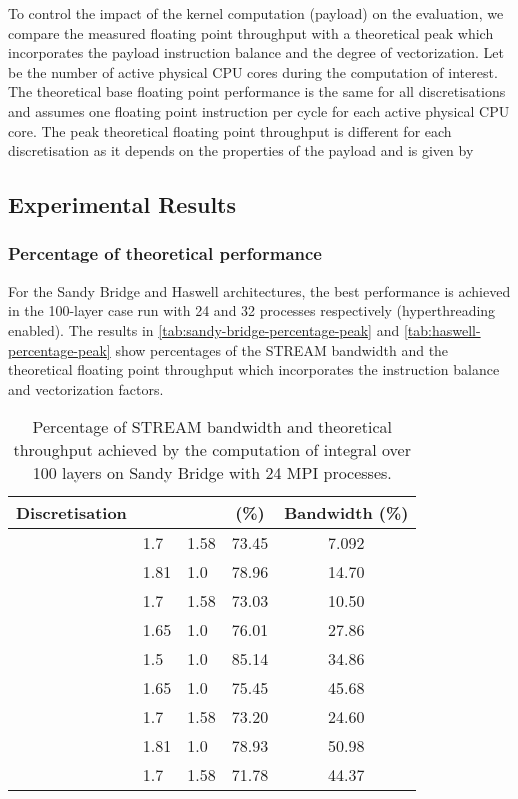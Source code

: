 \documentclass[11pt, a4paper]{scrartcl}
\begin{document}
To control the impact of the kernel computation (payload) on the
evaluation, we compare the measured floating point throughput with a
theoretical peak which incorporates the payload instruction balance
and the degree of vectorization. Let  be the number of active
physical CPU cores during the computation of interest. The theoretical
base floating point performance  is the same for all
discretisations and assumes one floating point instruction per cycle
for each active physical CPU core. The peak theoretical floating point
throughput  is different for each discretisation  as it
depends on the properties of the payload and is given by


\subsection{Experimental Results}
\label{ssec:experimental-results}

\subsubsection{Percentage of theoretical performance}
\label{sssec:percentage-theoretical}
For the Sandy Bridge and Haswell architectures, the best performance
is achieved in the 100-layer case run with 24 and 32 processes
respectively (hyperthreading enabled).
The results in \autoref{tab:sandy-bridge-percentage-peak} and
\autoref{tab:haswell-percentage-peak} show percentages of the STREAM
bandwidth and the theoretical floating point throughput which
incorporates the instruction balance and vectorization factors.
\begin{table}[htbp]
\centering
\begin{tabular}{l|l|l|c|c}
Discretisation                     &  &  &  (\%) & Bandwidth (\%) \\
\hline
 & 1.7     & 1.58    & 73.45        & 7.092          \\
 & 1.81    & 1.0     & 78.96        & 14.70          \\
 & 1.7     & 1.58    & 73.03        & 10.50          \\
 & 1.65    & 1.0     & 76.01        & 27.86          \\
 & 1.5     & 1.0     & 85.14        & 34.86          \\
 & 1.65    & 1.0     & 75.45        & 45.68          \\
 & 1.7     & 1.58    & 73.20        & 24.60          \\
 & 1.81    & 1.0     & 78.93        & 50.98          \\
 & 1.7     & 1.58    & 71.78        & 44.37          \\
\end{tabular}
\caption{Percentage of STREAM bandwidth and theoretical throughput
  achieved by the computation of integral  over 100 layers on Sandy
  Bridge with 24 MPI
  processes.\label{tab:sandy-bridge-percentage-peak}}
\end{table}
 
\end{document}
